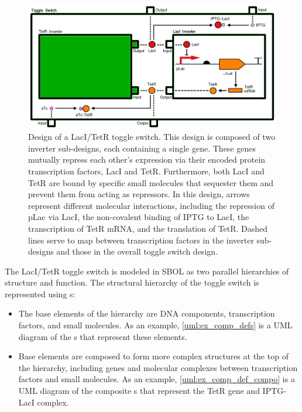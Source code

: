 \begin{figure}[ht]
\begin{center}
\includegraphics[scale=0.4]{images/toggleswitch_modular}
\caption[]{Design of a LacI/TetR toggle switch. This design is composed of two inverter sub-designs, each containing a single gene. These genes mutually repress each other's expression via their encoded protein transcription factors, LacI and TetR. Furthermore, both LacI and TetR are bound by specific small molecules that sequester them and prevent them from acting as repressors. In this design, arrows represent different molecular interactions, including the repression of pLac via LacI, the non-covalent binding of IPTG to LacI, the transcription of TetR mRNA, and the translation of TetR. Dashed lines serve to map between transcription factors in the inverter sub-designs and those in the overall toggle switch design.}
\label{images:toggleswitch_modular}
\end{center}
\end{figure}

The LacI/TetR toggle switch is modeled in SBOL as two parallel hierarchies of structure and function. The structural hierarchy of the toggle switch is represented using s:
\begin{itemize}
\item The base elements of the hierarchy are DNA components, transcription factors, and small molecules. As an example, \ref{uml:ex_comp_defs} is a UML diagram of the s that represent these elements.
\item Base elements are composed to form more complex structures at the top of the hierarchy, including genes and molecular complexes between transcription factors and small molecules. As an example, \ref{uml:ex_comp_def_compo} is a UML diagram of the composite s that represent the TetR gene and IPTG-LacI complex.
\end{itemize}

